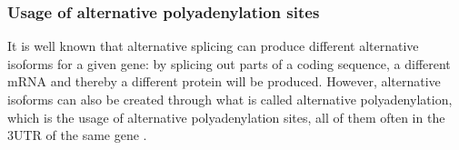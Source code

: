 



\subsubsection{Usage of alternative polyadenylation sites}
It is well known that alternative splicing can produce different alternative
isoforms for a given gene: by splicing out parts of a coding sequence, a
different mRNA and thereby a different protein will be produced. However,
alternative isoforms can also be created through what is called alternative
polyadenylation, which is the usage of alternative polyadenylation sites, all
of them often in the 3\ppp UTR of the same gene \cite{lutz_alternative_2008}.

